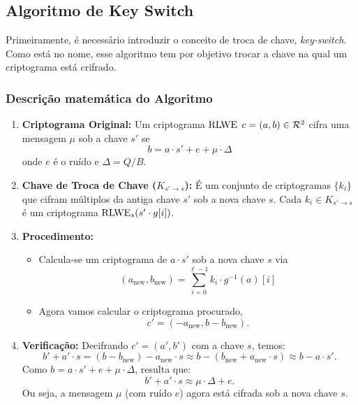\subsection{Algoritmo de Key Switch}
Primeiramente, é necessário introduzir o conceito de troca de chave, \textit{key-switch}. Como está no nome, esse algoritmo tem por objetivo trocar a chave na qual um criptograma está crifrado. 

\subsubsection{Descrição matemática do Algoritmo}

\begin{enumerate}
    \item \textbf{Criptograma Original:} Um criptograma $\text{RLWE}$ $c = (a, b) \in \mathcal{R}^2$ cifra uma mensagem $\mu$ sob a chave $s'$ se
    \[
        b = a \cdot s' + e + \mu \cdot \Delta
    \]
    onde $e$ é o ruído e $\Delta = Q/B$.

    \item \textbf{Chave de Troca de Chave ($K_{s' \to s}$):} É um conjunto de criptogramas $\{k_i\}$ que cifram múltiplos da antiga chave $s'$ sob a nova chave $s$.
    Cada $k_i \in K_{s' \to s}$ é um criptograma $\text{RLWE}_s(s' \cdot g[i])$.

    \item \textbf{Procedimento:}
    \begin{itemize}
        \item Calcula-se um criptograma de $a \cdot s'$ sob a nova chave $s$ via
        \[
            (a_{\text{new}}, b_{\text{new}}) = \sum_{i=0}^{\ell-1} k_i \cdot g^{-1}(a)[i]
        \]
        \item Agora vamos calcular o criptograma procurado,
        \[
            c' = (-a_{\text{new}}, b - b_{\text{new}}).
        \]
    \end{itemize}

    \item \textbf{Verificação:} Decifrando $c' = (a', b')$ com a chave $s$, temos:
    \[
        b' + a' \cdot s = (b - b_{\text{new}}) - a_{\text{new}} \cdot s \approx b - (b_{\text{new}} + a_{\text{new}} \cdot s) \approx b - a \cdot s'.
    \]
    Como $b = a \cdot s' + e + \mu \cdot \Delta$, resulta que:
    \[
        b' + a' \cdot s \approx \mu \cdot \Delta + e.
    \]
    Ou seja, a mensagem $\mu$ (com ruído $e$) agora está cifrada sob a nova chave $s$.
\end{enumerate}

